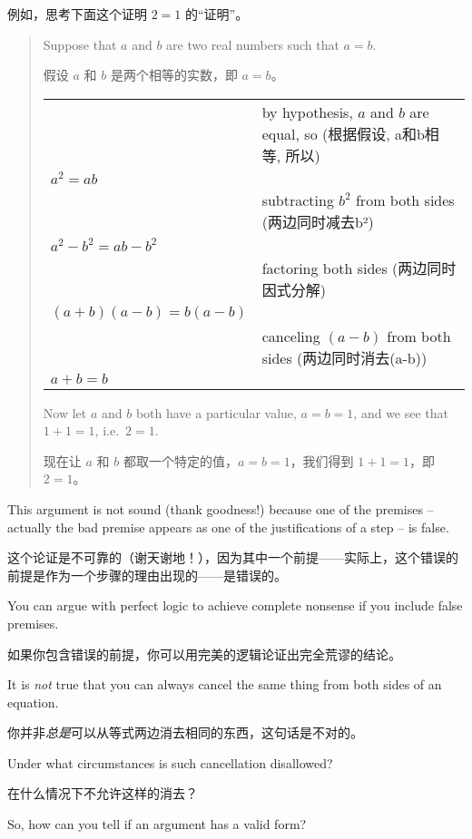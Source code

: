 例如，思考下面这个证明 $2=1$ 的“证明”。
\begin{quote}
  Suppose that $a$ and $b$ are two real numbers such that $a=b$.
  
  假设 $a$ 和 $b$ 是两个相等的实数，即 $a=b$。
  
\begin{center}
\begin{tabular}{p{2in}p{2in}}
 & by hypothesis, $a$ and $b$ are equal, so (根据假设, a和b相等, 所以)\\
 $a^2 = ab$ & \\
 & subtracting $b^2$ from both sides (两边同时减去b²)\\
 $a^2 - b^2 = ab - b^2$& \\
 & factoring both sides (两边同时因式分解)\\
 $(a+b)(a-b) = b(a-b)$ & \\
 & canceling $(a-b)$ from both sides (两边同时消去(a-b))\\
 $a+b = b$ & \\
\end{tabular}
\end{center}
\medskip
Now let $a$ and $b$ both have a particular value, $a=b=1$,
and we see that $1+1=1$, i.e.\ $2=1$.

现在让 $a$ 和 $b$ 都取一个特定的值，$a=b=1$，我们得到 $1+1=1$，即 $2=1$。
\end{quote}

This argument is not sound (thank goodness!) because one of the
premises -- actually the bad premise appears as one of the 
justifications of a step -- is false.

这个论证是不可靠的（谢天谢地！），因为其中一个前提——实际上，这个错误的前提是作为一个步骤的理由出现的——是错误的。

You can argue with
perfect logic to achieve complete nonsense if you include 
false premises.

如果你包含错误的前提，你可以用完美的逻辑论证出完全荒谬的结论。

\begin{exer}
It is \emph{not} true that you can always cancel the same thing from 
both sides of an equation.

你并非\emph{总是}可以从等式两边消去相同的东西，这句话是不对的。

Under what circumstances is such cancellation
disallowed?

在什么情况下不允许这样的消去？
\end{exer}

So, how can you tell if an argument has a valid form?

